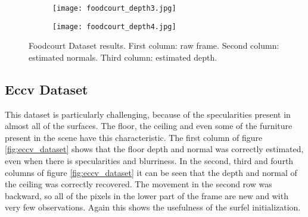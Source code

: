 \documentclass[1p]{elsarticle}
\begin{document}
\begin{figure}[h]
     \begin{subfigure}[b]{0.24\textwidth}
         \centering
         \texttt{[image: foodcourt\_depth3.jpg]}
     \end{subfigure}
     \begin{subfigure}[b]{0.24\textwidth}
         \centering
         \texttt{[image: foodcourt\_depth4.jpg]}
     \end{subfigure}
        \caption{Foodcourt Dataset results. First column: raw frame. Second column: estimated normals. Third column: estimated depth.}
        \label{fig:foodcourt_dataset}
\end{figure}

\subsection{Eccv Dataset}

This dataset is particularly challenging, because of the specularities present in almost all of the surfaces. The floor, the ceiling and even some of the furniture present in the scene have this characteristic. The first column of figure \ref{fig:eccv_dataset} shows that the floor depth and normal was correctly estimated, even when there is specularities and blurriness. In the second, third and fourth columns of figure \ref{fig:eccv_dataset} it can be seen that the depth and normal of the ceiling was correctly recovered. The movement in the second row was backward, so all of the pixels in the lower part of the frame are new and with very few observations. Again this shows the usefulness of the surfel initialization.
\end{document}

